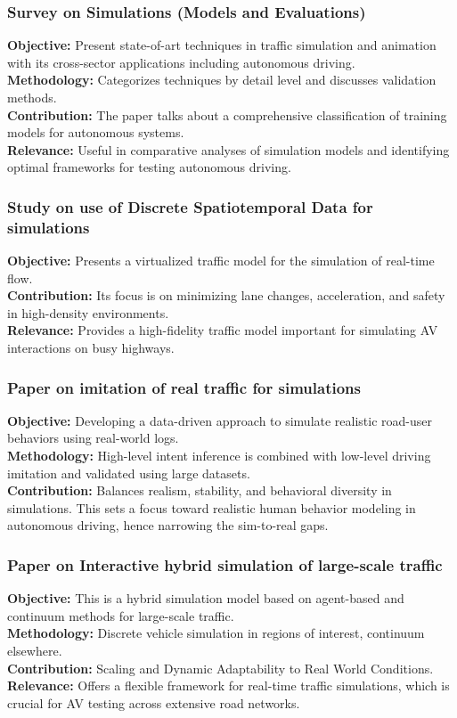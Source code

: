 \documentclass[lettersize,journal]{IEEEtran}
\begin{document}
\subsubsection{Survey on Simulations (Models and Evaluations)}\cite{ref45}
\textbf{Objective:} Present state-of-art techniques in traffic simulation and animation with its cross-sector applications including autonomous driving. \\
\textbf{Methodology:} Categorizes techniques by detail level and discusses validation methods. \\
\textbf{Contribution:} The paper talks about a comprehensive classification of training models for autonomous systems. \\
\textbf{Relevance:} Useful in comparative analyses of simulation models and identifying optimal frameworks for testing autonomous driving.

\subsubsection{Study on use of Discrete Spatiotemporal Data for simulations}\cite{ref46}
\textbf{Objective:} Presents a virtualized traffic model for the simulation of real-time flow. \\
\textbf{Contribution:} Its focus is on minimizing lane changes, acceleration, and safety in high-density environments. \\
\textbf{Relevance:} Provides a high-fidelity traffic model important for simulating AV interactions on busy highways.

\subsubsection{Paper on imitation of real traffic for simulations}\cite{ref47}
\textbf{Objective:} Developing a data-driven approach to simulate realistic road-user behaviors using real-world logs. \\
\textbf{Methodology:} High-level intent inference is combined with low-level driving imitation and validated using large datasets. \\
\textbf{Contribution:} Balances realism, stability, and behavioral diversity in simulations. This sets a focus toward realistic human behavior modeling in autonomous driving, hence narrowing the sim-to-real gaps.

\subsubsection{Paper on Interactive hybrid simulation of large-scale traffic}\cite{ref48}
\textbf{Objective:} This is a hybrid simulation model based on agent-based and continuum methods for large-scale traffic. \\
\textbf{Methodology:} Discrete vehicle simulation in regions of interest, continuum elsewhere. \\
\textbf{Contribution:} Scaling and Dynamic Adaptability to Real World Conditions. \\
\textbf{Relevance:} Offers a flexible framework for real-time traffic simulations, which is crucial for AV testing across extensive road networks.
\end{document}
